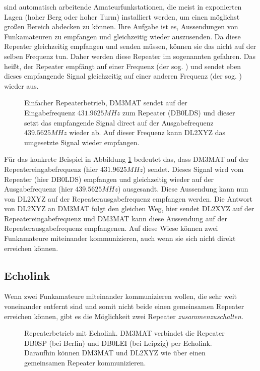  sind automatisch arbeitende Amateurfunkstationen, die meist in exponierten Lagen (hoher Berg oder hoher Turm) installiert werden, um einen möglichst großen Bereich abdecken zu können. Ihre Aufgabe ist es, Aussendungen von Funkamateuren zu empfangen und gleichzeitig wieder auszusenden. Da diese Repeater gleichzeitig empfangen und senden müssen, können sie das nicht auf der selben Frequenz tun. Daher werden diese Repeater im sogenannten  gefahren. Das heißt, der Repeater empfängt auf einer Frequenz (der sog. ) und sendet eben dieses empfangende Signal gleichzeitig auf einer anderen Frequenz (der sog. ) wieder aus. 

\begin{figure}[!ht]
 \centering
 
 
 \caption{Einfacher Repeaterbetrieb, DM3MAT sendet auf der Eingabefrequenz $431.9625 MHz$ zum Repeater (DB0LDS) und dieser setzt das empfangende Signal direct auf der Ausgabefrequenz $439.5625 MHz$ wieder ab. Auf dieser Frequenz kann DL2XYZ das umgesetzte Signal wieder empfangen.} \label{fig:basicrepeater}
\end{figure}

Für das konkrete Beispiel in Abbildung \ref{fig:basicrepeater} bedeutet das, dass DM3MAT auf der Repeatereingabefrequenz (hier $431.9625 MHz$) sendet. Dieses Signal wird vom Repeater (hier DB0LDS) empfangen und gleichzeitig wieder auf der Ausgabefrequenz (hier $439.5625 MHz$) ausgesandt. Diese Aussendung kann nun von DL2XYZ auf der Repeaterausgabefrequenz empfangen werden. Die Antwort von DL2XYZ an DM3MAT folgt den gleichen Weg, hier sendet DL2XYZ auf der Repeatereingabefrequenz und DM3MAT kann diese Aussendung auf der Repeaterausgabefrequenz empfangenen. Auf diese Wiese können zwei Funkamateure miteinander kommunizieren, auch wenn sie sich nicht direkt erreichen können. 

\subsection{Echolink} \label{sec:echolink} 
Wenn zwei Funkamateure miteinander kommunizieren wollen, die sehr weit voneinander entfernt sind und somit nicht beide einen gemeinsamen Repeater erreichen können, gibt es die Möglichkeit zwei Repeater \emph{zusammenzuschalten}. 

\begin{figure}[!ht]
 \centering
 
 
 
 \caption{Repeaterbetrieb mit Echolink. DM3MAT verbindet die Repeater DB0SP (bei Berlin) und DB0LEI (bei Leipzig) per Echolink. Daraufhin können DM3MAT und DL2XYZ wie über einen gemeinsamen Repeater kommunizieren.} \label{fig:echolink}
\end{figure}


